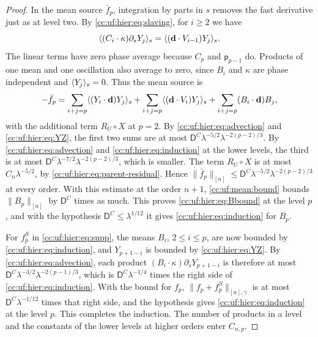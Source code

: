 \begin{proof}
In the mean source $\bar f_p$, integration by parts in $s$ removes the
fast derivative just as at level two. By \eqref{cc:uf:hier:eq:slaving},
for $i\ge2$ we have
\begin{equation}\label{cc:uf:hier:eq:fast-mean}
 \langle (C_i\cdot\kappa)\partial_sY_j\rangle_s
                 =\langle (\mathbf d\cdot V_{i-1})Y_j\rangle_s.
\end{equation}
The linear terms have zero phase average because $C_p$ and
$\mathsf p_{p-1}$ do. Products of one mean and one oscillation also
average to zero, since $B_i$ and $\kappa$ are phase independent and
$\langle Y_j\rangle_s=0$. Thus the mean source is
\[
 -\bar f_p=
 \sum_{i+j=p}\langle (Y_i\cdot\mathbf d)Y_j\rangle_s
 +\sum_{i+j=p}\langle (\mathbf d\cdot V_i)Y_j\rangle_s
 +\sum_{i+j=p}(B_i\cdot\mathbf d)B_j,
\]
with the additional term $R_U\circ X$ at $p=2$. By
\eqref{cc:uf:hier:eq:advection} and \eqref{cc:uf:hier:eq:YZ}, the first
two sums are at most $\mathsf D^C\lambda^{-5/2}\lambda^{-2(p-2)/3}$.
By \eqref{cc:uf:hier:eq:advection} and
\eqref{cc:uf:hier:eq:induction} at the lower levels, the third is at
most $\mathsf D^C\lambda^{-7/2}\lambda^{-2(p-2)/3}$, which is smaller.
The term $R_U\circ X$ is at most $C_n\lambda^{-5/2}$, by
\eqref{cc:uf:hier:eq:parent-residual}. Hence
$\|\bar f_p\|_{[n]}\le\mathsf D^C\lambda^{-5/2}\lambda^{-2(p-2)/3}$
at every order. With this estimate at the order $n+1$,
\eqref{cc:uf:mean:bound} bounds $\|B_p\|_{[n]}$ by $\mathsf D^C$ times
as much. This proves \eqref{cc:uf:hier:eq:Bbound} at the level $p$, and
with the hypothesis $\mathsf D^C\le\lambda^{1/12}$ it gives
\eqref{cc:uf:hier:eq:induction} for $B_p$.

For $f_p^S$ in \eqref{cc:uf:hier:eq:supp}, the means
$B_i$, $2\le i\le p$, are now bounded by
\eqref{cc:uf:hier:eq:induction}, and $Y_{p+1-i}$ is bounded by
\eqref{cc:uf:hier:eq:YZ}. By \eqref{cc:uf:hier:eq:advection}, each
product $(B_i\cdot\kappa)\partial_sY_{p+1-i}$ is therefore at most
$\mathsf D^C\lambda^{-3/2}\lambda^{-2(p-1)/3}$, which is
$\mathsf D^C\lambda^{-1/4}$ times the right side of
\eqref{cc:uf:hier:eq:induction}. With the bound for $f_p$,
$\|f_p+f_p^S\|_{[n],\gamma}$ is at most $\mathsf D^C\lambda^{-1/12}$
times that right side, and the hypothesis gives
\eqref{cc:uf:hier:eq:induction} at the level $p$. This completes the
induction. The number of products in a level and the constants of the
lower levels at higher orders enter $C_{n,p}$.


\end{proof}
